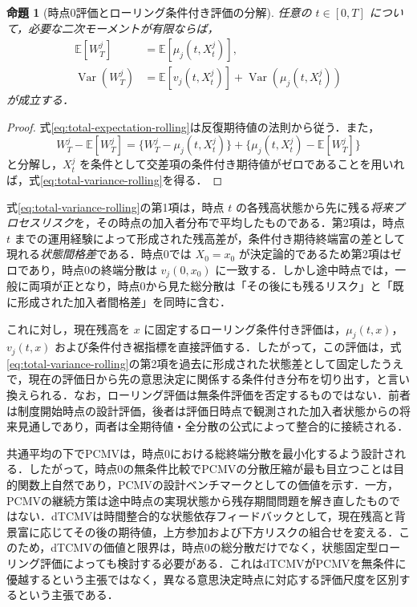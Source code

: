\documentclass[10pt,a4paper]{article}
\theoremstyle{plain}
\newtheorem{proposition}{命題}
\theoremstyle{definition}
\newcommand{\E}{\mathbb{E}}
\DeclareMathOperator{\Var}{Var}
\begin{document}
\begin{proposition}[時点0評価とローリング条件付き評価の分解]
\label{prop:total-variance-rolling}
任意の $t\in[0,T]$ について，必要な二次モーメントが有限ならば，
\begin{align}
  \E[W_T^j]
  &=\E\!\left[\mu_j(t,X_t^j)\right],
  \label{eq:total-expectation-rolling}\\
  \Var(W_T^j)
  &=\E\!\left[v_j(t,X_t^j)\right]
    +\Var\!\left(\mu_j(t,X_t^j)\right)
  \label{eq:total-variance-rolling}
\end{align}
が成立する．
\end{proposition}

\begin{proof}
式\eqref{eq:total-expectation-rolling}は反復期待値の法則から従う．また，
\[
 W_T^j-\E[W_T^j]
 =\{W_T^j-\mu_j(t,X_t^j)\}
  +\{\mu_j(t,X_t^j)-\E[W_T^j]\}
\]
と分解し，$X_t^j$ を条件として交差項の条件付き期待値がゼロであることを用いれば，式\eqref{eq:total-variance-rolling}を得る．
\end{proof}

式\eqref{eq:total-variance-rolling}の第1項は，時点 $t$ の各残高状態から先に残る\emph{将来プロセスリスク}を，その時点の加入者分布で平均したものである．第2項は，時点 $t$ までの運用経験によって形成された残高差が，条件付き期待終端富の差として現れる\emph{状態間格差}である．時点0では $X_0=x_0$ が決定論的であるため第2項はゼロであり，時点0の終端分散は $v_j(0,x_0)$ に一致する．しかし途中時点では，一般に両項が正となり，時点0から見た総分散は「その後にも残るリスク」と「既に形成された加入者間格差」を同時に含む．

これに対し，現在残高を $x$ に固定するローリング条件付き評価は，$\mu_j(t,x)$，$v_j(t,x)$ および条件付き裾指標を直接評価する．したがって，この評価は，式\eqref{eq:total-variance-rolling}の第2項を過去に形成された状態差として固定したうえで，現在の評価日から先の意思決定に関係する条件付き分布を切り出す，と言い換えられる．なお，ローリング評価は無条件評価を否定するものではない．前者は制度開始時点の設計評価，後者は評価日時点で観測された加入者状態からの将来見通しであり，両者は全期待値・全分散の公式によって整合的に接続される．

共通平均の下でPCMVは，時点0における総終端分散を最小化するよう設計される．したがって，時点0の無条件比較でPCMVの分散圧縮が最も目立つことは目的関数上自然であり，PCMVの設計ベンチマークとしての価値を示す．一方，PCMVの継続方策は途中時点の実現状態から残存期間問題を解き直したものではない．dTCMVは時間整合的な状態依存フィードバックとして，現在残高と背景富に応じてその後の期待値，上方参加および下方リスクの組合せを変える．このため，dTCMVの価値と限界は，時点0の総分散だけでなく，状態固定型ローリング評価によっても検討する必要がある．これはdTCMVがPCMVを無条件に優越するという主張ではなく，異なる意思決定時点に対応する評価尺度を区別するという主張である．
\end{document}
